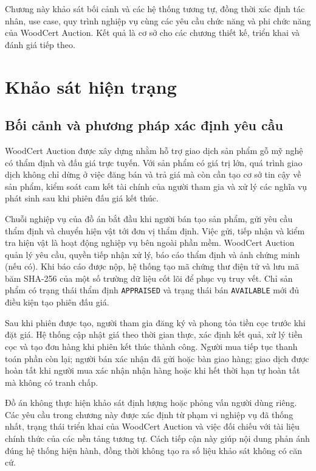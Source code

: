 \documentclass[../DoAn.tex]{subfiles}
\begin{document}
\raggedbottom

Chương này khảo sát bối cảnh và các hệ thống tương tự, đồng thời xác định tác nhân, use case, quy trình nghiệp vụ cùng các yêu cầu chức năng và phi chức năng của WoodCert Auction. Kết quả là cơ sở cho các chương thiết kế, triển khai và đánh giá tiếp theo.

\section{Khảo sát hiện trạng}
\label{section:2.1}

\subsection{Bối cảnh và phương pháp xác định yêu cầu}

WoodCert Auction được xây dựng nhằm hỗ trợ giao dịch sản phẩm gỗ mỹ nghệ có thẩm định và đấu giá trực tuyến. Với sản phẩm có giá trị lớn, quá trình giao dịch không chỉ dừng ở việc đăng bán và trả giá mà còn cần tạo cơ sở tin cậy về sản phẩm, kiểm soát cam kết tài chính của người tham gia và xử lý các nghĩa vụ phát sinh sau khi phiên đấu giá kết thúc.

Chuỗi nghiệp vụ của đồ án bắt đầu khi người bán tạo sản phẩm, gửi yêu cầu thẩm định và chuyển hiện vật tới đơn vị thẩm định. Việc gửi, tiếp nhận và kiểm tra hiện vật là hoạt động nghiệp vụ bên ngoài phần mềm. WoodCert Auction quản lý yêu cầu, quyền tiếp nhận xử lý, báo cáo thẩm định và ảnh chứng minh (nếu có). Khi báo cáo được nộp, hệ thống tạo mã chứng thư điện tử và lưu mã băm SHA-256 của một số trường dữ liệu cốt lõi để phục vụ truy vết. Chỉ sản phẩm có trạng thái thẩm định \texttt{APPRAISED} và trạng thái bán \texttt{AVAILABLE} mới đủ điều kiện tạo phiên đấu giá.

Sau khi phiên được tạo, người tham gia đăng ký và phong tỏa tiền cọc trước khi đặt giá. Hệ thống cập nhật giá theo thời gian thực, xác định kết quả, xử lý tiền cọc và tạo đơn hàng khi phiên kết thúc thành công. Người mua tiếp tục thanh toán phần còn lại; người bán xác nhận đã gửi hoặc bàn giao hàng; giao dịch được hoàn tất khi người mua xác nhận nhận hàng hoặc khi hết thời hạn tự hoàn tất mà không có tranh chấp.

Đồ án không thực hiện khảo sát định lượng hoặc phỏng vấn người dùng riêng. Các yêu cầu trong chương này được xác định từ phạm vi nghiệp vụ đã thống nhất, trạng thái triển khai của WoodCert Auction và việc đối chiếu với tài liệu chính thức của các nền tảng tương tự. Cách tiếp cận này giúp nội dung phản ánh đúng hệ thống hiện hành, đồng thời không tạo ra số liệu khảo sát không có căn cứ.
\end{document}
